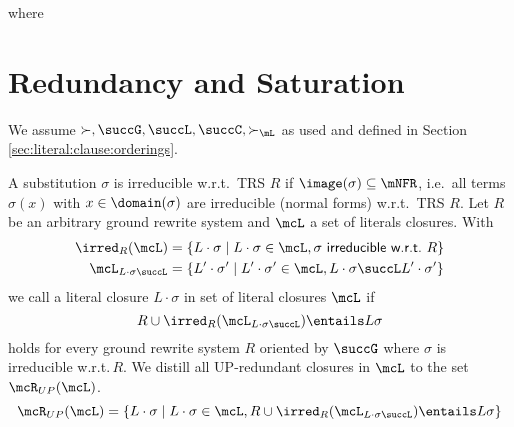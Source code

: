 
\begin{definition}

where

\end{definition}

\section{Redundancy and Saturation}
    We assume $\succ, \succG, \succL, \succC, \succ_\mL$
    as used and defined in
    Section \vref{sec:literal:clause:orderings}.

\begin{definition}
    A substitution \( \sigma \) is irreducible w.r.t.~TRS \( R \)
    if
    \( \image(\sigma)\subseteq\mNFR \),
    i.e.~all terms \(\sigma(x)\) with
    \( x\in\domain(\sigma) \) are irreducible (normal forms) w.r.t.~TRS \(R\).
    Let $R$ be an arbitrary ground rewrite system
    and $\mcL$ a set of literals closures.
    With
    \begin{align*}
        \irred_R(\mcL) &= \{ L\cdot\sigma \mid L\cdot\sigma\in\mcL,
        \sigma\textsf{ irreducible w.r.t.~}R \}
    \\
        \mcL_{L\cdot\sigma\succL} &= \{
            L'\cdot\sigma'\mid L'\cdot\sigma'\in\mcL, L\cdot\sigma\succL L'\cdot\sigma'
            \}
    \end{align*}
    we call a literal closure $L\cdot\sigma$ 
    in set of literal closures $\mcL$
    if
    \[
        R \cup \irred_R(\mcL_{L\cdot\sigma\succL}) \entails L\sigma
    \]
    holds for every ground rewrite system $R$ oriented by $\succG$
    where $\sigma$ is irreducible w.r.t.\,$R$.
    We distill all UP-redundant closures in \( \mcL \) to the set
    \( \mcR_{UP}(\mcL) \).
    \[
        \mcR_{UP}(\mcL) = \{
            L\cdot\sigma
            \mid
            L\cdot\sigma \in \mcL,
            R \cup \irred_R(\mcL_{L\cdot\sigma\succL}) \entails L\sigma
        \}
    \]

\end{definition}

